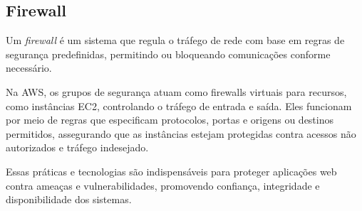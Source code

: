 \subsection{Firewall}


Um \emph{firewall} é um sistema que regula o tráfego de rede com base em regras de segurança predefinidas, permitindo ou bloqueando comunicações conforme necessário.

Na AWS, os grupos de segurança atuam como firewalls virtuais para recursos, como instâncias EC2, controlando o tráfego de entrada e saída. Eles funcionam por meio de regras que especificam protocolos, portas e origens ou destinos permitidos, assegurando que as instâncias estejam protegidas contra acessos não autorizados e tráfego indesejado.

Essas práticas e tecnologias são indispensáveis para proteger aplicações web contra ameaças e vulnerabilidades, promovendo confiança, integridade e disponibilidade dos sistemas.









